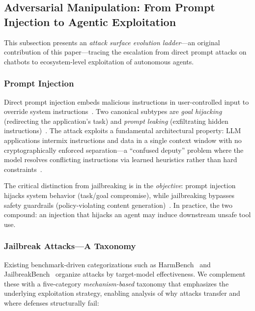 \subsection{Adversarial Manipulation: From Prompt Injection to Agentic Exploitation}
\label{sec:threat-adversarial}


This subsection presents an \emph{attack surface evolution ladder}---an original contribution of this paper---tracing the escalation from direct prompt attacks on chatbots to ecosystem-level exploitation of autonomous agents.

\subsubsection{Prompt Injection}
\label{sec:threat-pi}

Direct prompt injection embeds malicious instructions in user-controlled input to override system instructions~\cite{perez2022ignore}. Two canonical subtypes are \emph{goal hijacking} (redirecting the application's task) and \emph{prompt leaking} (exfiltrating hidden instructions)~\cite{perez2022ignore}. The attack exploits a fundamental architectural property: LLM applications intermix instructions and data in a single context window with no cryptographically enforced separation---a ``confused deputy'' problem where the model resolves conflicting instructions via learned heuristics rather than hard constraints~\cite{greshake2023ipi}.

The critical distinction from jailbreaking is in the \emph{objective}: prompt injection hijacks system behavior (task/goal compromise), while jailbreaking bypasses safety guardrails (policy-violating content generation)~\cite{perez2022ignore,chao2024jailbreakbench}. In practice, the two compound: an injection that hijacks an agent may induce downstream unsafe tool use.


\subsubsection{Jailbreak Attacks---A Taxonomy}
\label{sec:threat-jailbreak}

Existing benchmark-driven categorizations such as HarmBench~\cite{mazeika2024harmbench} and JailbreakBench~\cite{chao2024jailbreakbench} organize attacks by target-model effectiveness. We complement these with a five-category \emph{mechanism-based} taxonomy that emphasizes the underlying exploitation strategy, enabling analysis of why attacks transfer and where defenses structurally fail:

